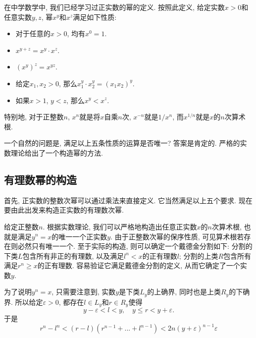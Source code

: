 

在中学数学中, 我们已经学习过正实数的幂的定义. 按照此定义, 给定实数$x>0$和任意实数$y,z$, 幂$x^y$和$x^z$满足如下性质:

\begin{itemize}
\item 对于任意的$x>0$, 均有$x^0=1$.
\item $x^{y+z}=x^y\cdot x^z$.
\item $(x^y)^z=x^{yz}$.
\item 给定$x_1,x_2>0$, 那么$x_1^y\cdot x_2^y=(x_1x_2)^y$.
\item 如果$x>1$, $y<z$, 那么$x^y<x^z$.
\end{itemize}

特别地, 对于正整数$n$, $x^n$就是将$x$自乘$n$次, $x^{-n}$就是$1/x^n$, 而$x^{1/n}$就是$x$的$n$次算术根. 

一个自然的问题是, 满足以上五条性质的运算是否唯一? 答案是肯定的. 严格的实数理论给出了一个构造幂的方法.

\subsection{有理数幂的构造}

首先, 正实数的整数次幂可以通过乘法来直接定义. 它当然满足以上五个要求. 现在要由此出发来构造正实数的有理数次幂.

给定正整数$n$. 根据实数理论, 我们可以严格地构造出任意正实数$x$的$n$次算术根, 也就是满足$y^n=x$的唯一一个正实数$y$. 由于正整数次幂的保序性质, 可见算术根若存在则必然只有唯一一个. 至于实际的构造, 则可以确定一个戴德金分割如下: 分割的下类$L$包含所有非正的有理数, 以及满足$l^n<x$的正有理数$l$; 分割的上类$R$包含所有满足$r^n\geq x$的正有理数. 容易验证它满足戴德金分割的定义, 从而它确定了一个实数$y$. 

为了说明$y^n=x$, 只需要注意到, 实数$y$是下类$L_y$的上确界, 同时也是上类$R_y$的下确界. 所以给定$\varepsilon>0$, 都存在$l\in L_y$和$r\in R_y$使得
\[
y-\varepsilon<l<y,\quad y\leq r<y+\varepsilon.
\]
于是
\[ 
r^n-l^n<(r-l)(r^{n-1}+...+l^{n-1})
<2n(y+\varepsilon)^{n-1}\varepsilon
\]
